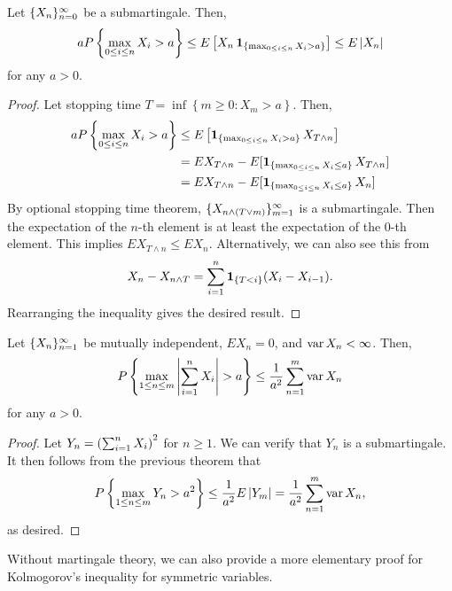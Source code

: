 \documentclass[a4paper]{article}
\begin{document}
\begin{thm}
  Let $\{ X_n \}_{n=0}^\infty$ be a submartingale. Then, 
  \[
  a P \left\{ \max_{0 \leq i \leq n} X_i > a \right\}
  \leq E \left[ X_n \operatorname{\mathbf{1}}_{\{\max_{0 \leq i \leq n} X_i > a \}} \right]
  \leq E \left\lvert X_n\right\rvert
  \]
  for any $a > 0$.
\end{thm}

\begin{proof}
  Let stopping time $T = \inf \left\{ m \geq 0 : X_m > a \right\}$.
  Then, 
  \begin{align*}
    a P \left\{ \max_{0 \leq i \leq n} X_i > a \right\}
    &\leq E \left[ \operatorname{\mathbf{1}}_{\{ \max_{0 \leq i \leq n}
     X_i > a \}} X_{T \wedge n} \right] \\
    &= E X_{T \wedge n} - 
    E [\operatorname{\mathbf{1}}_{\{\max_{0 \leq i \leq n} X_i \leq a\}} X_{T \wedge n}] \\
    &= E X_{T \wedge n} - 
    E [\operatorname{\mathbf{1}}_{\{\max_{0 \leq i \leq n} X_i \leq a\}} X_{n}] \\
  \end{align*}
  By optional stopping time theorem, $\{ X_{n \wedge (T \vee m)} \}_{m=1}^\infty$
  is a submartingale. Then the expectation of 
  the $n$-th element is at least the expectation of 
  the $0$-th element. This implies $E X_{T \wedge n} \leq E X_n$.
  Alternatively, we can also see this from 
  \[
  X_n - X_{n \wedge T} = \sum_{i=1}^n \operatorname{\mathbf{1}}_{\{T < i\}} (X_i - X_{i - 1}).
  \]
  Rearranging the inequality gives the desired result.

\end{proof}

\begin{cor}
  Let $\{ X_n \}_{n=1}^\infty$ be mutually independent, $E X_n = 0$, 
  and $\operatorname{var} X_n < \infty$. Then, 
  \[
  P \left\{ \max_{1 \leq n \leq m} \left\lvert \sum_{i=1}^n X_i\right\rvert > a \right\}
  \leq \frac{1}{a^2} \sum_{n=1}^m \operatorname{var} X_n
  \]
  for any $a > 0$.
\end{cor}

\begin{proof}
  Let $Y_n = \left( \sum_{i=1}^n X_i \right)^2$ for $n \geq 1$.
  We can verify that $Y_n$ is a submartingale. It then 
  follows from the previous theorem that 
  \[
  P \left\{ \max_{1 \leq n \leq m} Y_n > a^2 \right\}
  \leq \frac{1}{a^2} E \left\lvert Y_m\right\rvert = \frac{1}{a^2} \sum_{n=1}^m \operatorname{var} X_n,
  \]
  as desired.
\end{proof}

Without martingale theory, we can also provide a more elementary
proof for Kolmogorov's inequality for symmetric variables. 
\end{document}

